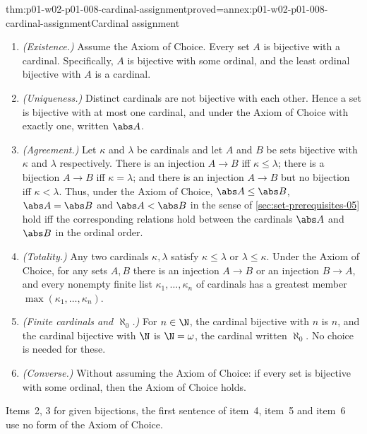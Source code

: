 \begin{hbcorollary}{thm:p01-w02-p01-008-cardinal-assignment}{proved=annex:p01-w02-p01-008-cardinal-assignment}{Cardinal assignment}
\begin{enumerate}
  \item \emph{(Existence.)} Assume the Axiom of Choice. Every set \(A\) is
        bijective with a cardinal. Specifically, \(A\) is bijective with some
        ordinal, and the least ordinal bijective with \(A\) is a cardinal.
  \item \emph{(Uniqueness.)} Distinct cardinals are not bijective with each
        other. Hence a set is bijective with at most one cardinal, and under
        the Axiom of Choice with exactly one, written \(\abs A\).
  \item \emph{(Agreement.)} Let \(\kappa\) and \(\lambda\) be cardinals and
        let \(A\) and \(B\) be sets bijective with \(\kappa\) and \(\lambda\)
        respectively. There is an injection \(A\to B\) iff
        \(\kappa\leq\lambda\); there is a bijection \(A\to B\) iff
        \(\kappa=\lambda\); and there is an injection \(A\to B\) but no
        bijection iff \(\kappa<\lambda\). Thus, under the Axiom of Choice,
        \(\abs A\leq\abs B\), \(\abs A=\abs B\) and \(\abs A<\abs B\) in
        the sense of \cref{sec:set-prerequisites-05} hold iff the
        corresponding relations hold between the cardinals \(\abs A\) and
        \(\abs B\) in the ordinal order.
  \item \emph{(Totality.)} Any two cardinals \(\kappa,\lambda\) satisfy
        \(\kappa\leq\lambda\) or \(\lambda\leq\kappa\). Under the Axiom of
        Choice, for any sets \(A,B\) there is an injection \(A\to B\) or an
        injection \(B\to A\), and every nonempty finite list
        \(\kappa_1,\ldots,\kappa_n\) of cardinals has a greatest member
        \(\max(\kappa_1,\ldots,\kappa_n)\).
  \item \emph{(Finite cardinals and \(\aleph_0\).)} For \(n\in\N\), the
        cardinal bijective with \(n\) is \(n\), and the cardinal bijective
        with \(\N\) is \(\N=\omega\), the cardinal written \(\aleph_0\). No
        choice is needed for these.
  \item \emph{(Converse.)} Without assuming the Axiom of Choice: if every set
        is bijective with some ordinal, then the Axiom of Choice holds.
\end{enumerate}
Items~2, 3 for given bijections, the first sentence of item~4, item~5 and
item~6 use no form of the Axiom of Choice.
\end{hbcorollary}

